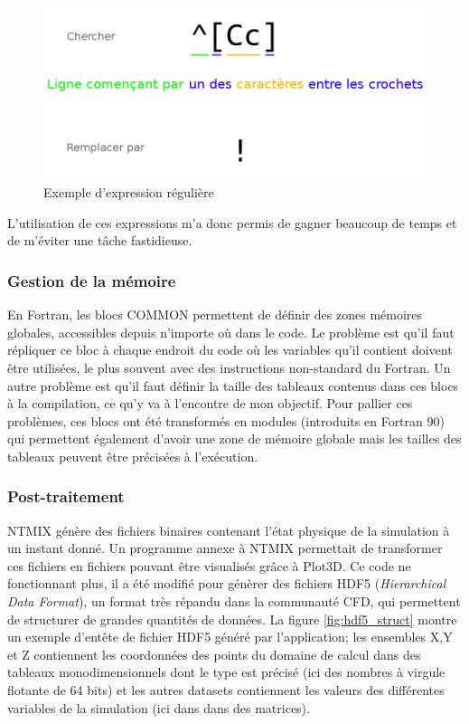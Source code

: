 \begin{figure}[ht]
  \centering
  \includegraphics[scale=0.3]{figures/regex.png}
  \caption{\label{fig:regex}Exemple d'expression régulière}
\end{figure}


L'utilisation de ces expressions m'a donc permis de gagner beaucoup de temps et de m'éviter une tâche fastidieuse.

\subsubsection{Gestion de la mémoire}En Fortran, les blocs COMMON permettent de définir des zones mémoires globales, accessibles depuis n'importe où dans le code. Le problème est qu'il faut répliquer ce bloc à chaque endroit du code où les variables qu'il contient doivent être utilisées, le plus souvent avec des instructions non-standard du Fortran. Un autre problème est qu'il faut définir la taille des tableaux contenus dans ces blocs à la compilation, ce qu'y va à l'encontre de mon objectif. Pour pallier ces problèmes, ces blocs ont été transformés en modules (introduits en Fortran 90) qui permettent également d'avoir une zone de mémoire globale mais les tailles des tableaux peuvent être précisées à l'exécution.

\subsubsection{Post-traitement}NTMIX génère des fichiers binaires contenant l'état physique de la simulation à un instant donné. Un programme annexe à NTMIX permettait de transformer ces fichiers en fichiers pouvant être visualisés grâce à Plot3D. Ce code ne fonctionnant plus, il a été modifié pour génèrer des fichiers HDF5 (\textit{Hierarchical Data Format}), un format très répandu dans la communauté CFD, qui permettent de structurer de grandes quantités de données. La figure \ref{fig:hdf5_struct} montre un exemple d'entête de fichier HDF5 généré par l'application; les ensembles X,Y et Z contiennent les coordonnées des points du domaine de calcul dans des tableaux monodimensionnels dont le type est précisé (ici des nombres à virgule flotante de 64 bits) et les autres datasets contiennent les valeurs des différentes variables de la simulation (ici dans dans des matrices).

